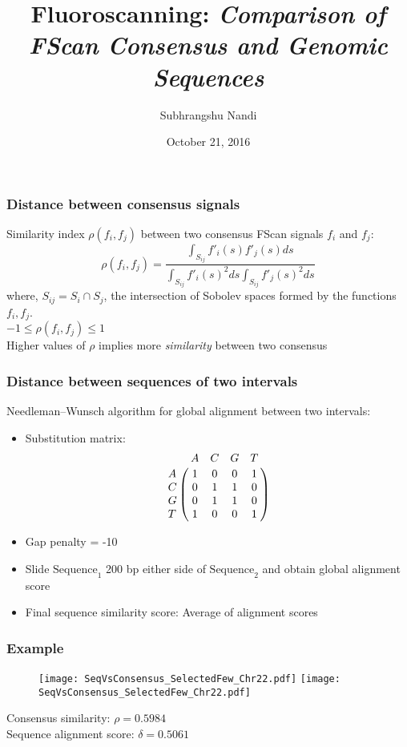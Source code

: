 \documentclass[10pt,dvipsnames,table]{beamer}
\title[Fluoroscanning]{Fluoroscanning: {\emph{Comparison of FScan Consensus and Genomic Sequences}}}
\author{Subhrangshu Nandi}
\date{October 21, 2016}
\begin{document}
\setlength{\baselineskip}{16truept}
\frame{\maketitle}

\begin{frame}
\frametitle{Distance between consensus signals}
Similarity index $\rho(f_i, f_j)$ between two consensus FScan signals $f_i$ and $f_j$:
\[ \rho(f_i, f_j) = \frac{\int _{S_{ij}}f'_i(s)f'_j(s) ds}{\int _{S_{ij}}f'_i(s)^2 ds \int _{S_{ij}}f'_j(s)^2 ds} \]
where, $S_{ij} = S_i \cap S_j$, the intersection of Sobolev spaces formed by the functions $f_i, f_j$.\\
$-1 \leq \rho(f_i, f_j) \leq 1$ \\
Higher values of $\rho$ implies more {\emph{similarity}} between two consensus

\end{frame}

\begin{frame}
\frametitle{Distance between sequences of two intervals}
Needleman–Wunsch algorithm for global alignment between two intervals:
\begin{itemize}
\item Substitution matrix: \\
\[ \bordermatrix{~  & A & C & G & T \cr
                  A & 1 & 0 & 0 & 1 \cr
                  C & 0 & 1 & 1 & 0 \cr
                  G & 0 & 1 & 1 & 0 \cr
                  T & 1 & 0 & 0 & 1 \cr
}
\]
\item Gap penalty = -10
\item Slide $\text{Sequence}_1$ 200 bp either side of $\text{Sequence}_2$ and obtain global alignment score
\item Final sequence similarity score: Average of alignment scores
\end{itemize}

\end{frame}

\begin{frame}
\frametitle{Example}
\begin{figure}
\begin{centering}
\texttt{[image: SeqVsConsensus\_SelectedFew\_Chr22.pdf]}
\texttt{[image: SeqVsConsensus\_SelectedFew\_Chr22.pdf]}
\end{centering}
\end{figure}
Consensus similarity: $\rho = 0.5984$ \\
Sequence alignment score: $\delta = 0.5061$

\end{frame}
\end{document}
